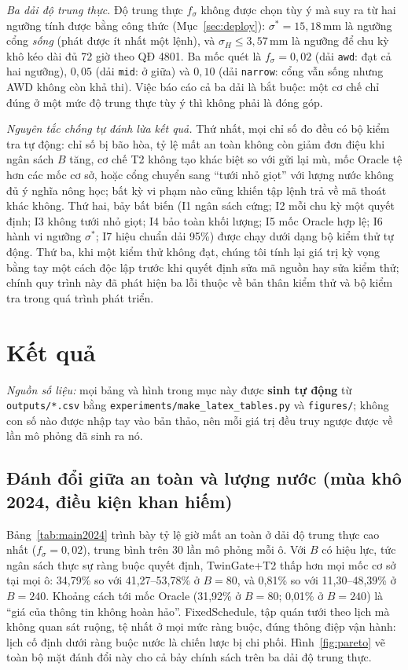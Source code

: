 \documentclass[10pt]{article}
\begin{document}
\emph{Ba dải độ trung thực.} Độ trung thực $f_\sigma$ không được chọn tùy ý mà suy ra từ hai ngưỡng tính được bằng công thức (Mục~\ref{sec:deploy}): $\sigma^{*}=15{,}18$\,mm là ngưỡng cổng \emph{sống} (phát được ít nhất một lệnh), và $\sigma_H \le 3{,}57$\,mm là ngưỡng để chu kỳ khô kéo dài đủ 72 giờ theo QĐ 4801. Ba mốc quét là $f_\sigma=0{,}02$ (dải \texttt{awd}: đạt cả hai ngưỡng), $0{,}05$ (dải \texttt{mid}: ở giữa) và $0{,}10$ (dải \texttt{narrow}: cổng vẫn sống nhưng AWD không còn khả thi). Việc báo cáo cả ba dải là bắt buộc: một cơ chế chỉ đúng ở một mức độ trung thực tùy ý thì không phải là đóng góp.

\emph{Nguyên tắc chống tự đánh lừa kết quả.} Thứ nhất, mọi chỉ số đo đều có bộ kiểm tra tự động: chỉ số bị bão hòa, tỷ lệ mất an toàn không còn giảm đơn điệu khi ngân sách $B$ tăng, cơ chế T2 không tạo khác biệt so với gửi lại mù, mốc Oracle tệ hơn các mốc cơ sở, hoặc cổng chuyển sang ``tưới nhỏ giọt'' với lượng nước không đủ ý nghĩa nông học; bất kỳ vi phạm nào cũng khiến tập lệnh trả về mã thoát khác không. Thứ hai, bảy bất biến (I1 ngân sách cứng; I2 mỗi chu kỳ một quyết định; I3 không tưới nhỏ giọt; I4 bảo toàn khối lượng; I5 mốc Oracle hợp lệ; I6 hành vi ngưỡng $\sigma^{*}$; I7 hiệu chuẩn dải 95\%) được chạy dưới dạng bộ kiểm thử tự động. Thứ ba, khi một kiểm thử không đạt, chúng tôi tính lại giá trị kỳ vọng bằng tay một cách độc lập trước khi quyết định sửa mã nguồn hay sửa kiểm thử; chính quy trình này đã phát hiện ba lỗi thuộc về bản thân kiểm thử và bộ kiểm tra trong quá trình phát triển.

\section{Kết quả}

\emph{Nguồn số liệu:} mọi bảng và hình trong mục này được \textbf{sinh tự động} từ \texttt{outputs/*.csv} bằng \texttt{experiments/make\_latex\_tables.py} và \texttt{figures/}; không con số nào được nhập tay vào bản thảo, nên mỗi giá trị đều truy ngược được về lần mô phỏng đã sinh ra nó.

\subsection{Đánh đổi giữa an toàn và lượng nước (mùa khô 2024, điều kiện khan hiếm)}
\label{sec:tradeoff}

Bảng~\ref{tab:main2024} trình bày tỷ lệ giờ mất an toàn ở dải độ trung thực cao nhất ($f_\sigma=0{,}02$), trung bình trên 30 lần mô phỏng mỗi ô. Với $B$ có hiệu lực, tức ngân sách thực sự ràng buộc quyết định, TwinGate+T2 thấp hơn mọi mốc cơ sở tại mọi ô: 34,79\% so với 41,27--53,78\% ở $B{=}80$, và 0,81\% so với 11,30--48,39\% ở $B{=}240$. Khoảng cách tới mốc Oracle (31,92\% ở $B{=}80$; 0,01\% ở $B{=}240$) là ``giá của thông tin không hoàn hảo''. FixedSchedule, tập quán tưới theo lịch mà không quan sát ruộng, tệ nhất ở mọi mức ràng buộc, đúng thông điệp vận hành: lịch cố định dưới ràng buộc nước là chiến lược bị chi phối. Hình~\ref{fig:pareto} vẽ toàn bộ mặt đánh đổi này cho cả bảy chính sách trên ba dải độ trung thực.
\end{document}
